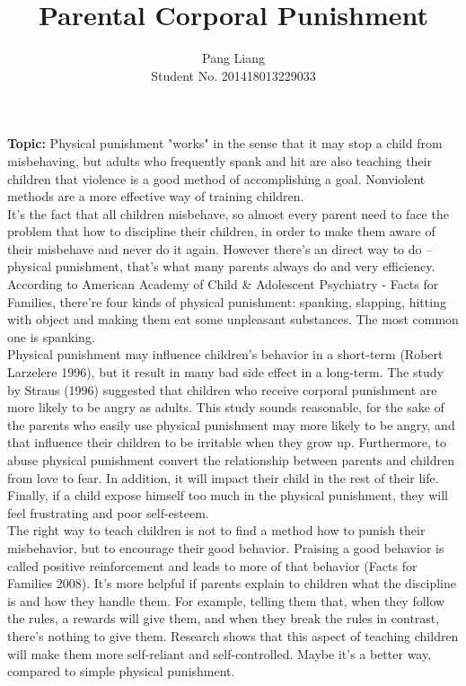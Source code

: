 \documentclass[12pt]{article}
\title{Parental Corporal Punishment}
\author{Pang Liang\\ Student No. 201418013229033}
\begin{document}
\maketitle

\textbf{Topic:} Physical punishment "works" in the sense that it may stop a child from misbehaving, but adults who frequently spank and hit are also teaching their children that violence is a good method of accomplishing a goal. Nonviolent methods are a more effective way of training children.\\

It's the fact that all children misbehave, so almost every parent need to face the problem that how to discipline their children, in order to make them aware of their misbehave and never do it again. However there's an direct way to do -- physical punishment, that's what many parents always do and very efficiency. According to American Academy of Child \& Adolescent Psychiatry - Facts for Families, there're four kinds of physical punishment: spanking, slapping, hitting with object and making them eat some unpleasant substances. The most common one is spanking.\\
Physical punishment may influence children's behavior in a short-term \parencite{aef2013org}(Robert Larzelere 1996), but it result in many bad side effect in a long-term. The study by Straus (1996) suggested that children who receive corporal punishment are more likely to be angry as adults. This study sounds reasonable, for the sake of the parents who easily use physical punishment may more likely to be angry, and that influence their children to be irritable when they grow up. Furthermore, to abuse physical punishment convert the relationship between parents and children from love to fear. In addition, it will impact their child in the rest of their life. Finally, if a child expose himself too much in the physical punishment, they will feel frustrating and poor self-esteem.\\
The right way to teach children is not to find a method how to punish their misbehavior, but to encourage their good behavior. Praising a good behavior is called positive reinforcement and leads to more of that behavior (Facts for Families 2008). It's more helpful if parents explain to children what the discipline is and how they handle them. For example, telling them that, when they follow the rules, a rewards will give them, and when they break the rules in contrast, there's nothing to give them. Research shows that this aspect of teaching children will make them more self-reliant and self-controlled. Maybe it's a better way, compared to simple physical punishment.

\printbibliography
\end{document}

